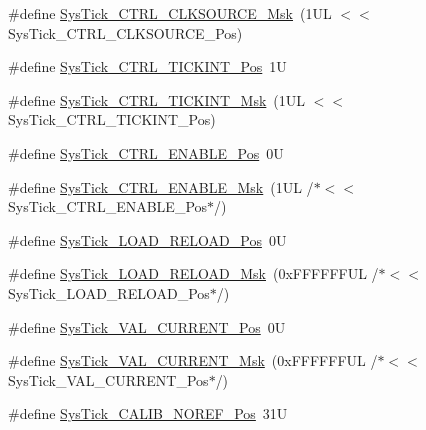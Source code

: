 \begin{DoxyCompactItemize}
\item 
\#define \mbox{\hyperlink{group___c_m_s_i_s___sys_tick_gaa41d06039797423a46596bd313d57373}{Sys\+Tick\+\_\+\+C\+T\+R\+L\+\_\+\+C\+L\+K\+S\+O\+U\+R\+C\+E\+\_\+\+Msk}}~(1\+U\+L $<$$<$ Sys\+Tick\+\_\+\+C\+T\+R\+L\+\_\+\+C\+L\+K\+S\+O\+U\+R\+C\+E\+\_\+\+Pos)
\item 
\#define \mbox{\hyperlink{group___c_m_s_i_s___sys_tick_ga88f45bbb89ce8df3cd2b2613c7b48214}{Sys\+Tick\+\_\+\+C\+T\+R\+L\+\_\+\+T\+I\+C\+K\+I\+N\+T\+\_\+\+Pos}}~1U
\item 
\#define \mbox{\hyperlink{group___c_m_s_i_s___sys_tick_ga95bb984266ca764024836a870238a027}{Sys\+Tick\+\_\+\+C\+T\+R\+L\+\_\+\+T\+I\+C\+K\+I\+N\+T\+\_\+\+Msk}}~(1\+U\+L $<$$<$ Sys\+Tick\+\_\+\+C\+T\+R\+L\+\_\+\+T\+I\+C\+K\+I\+N\+T\+\_\+\+Pos)
\item 
\#define \mbox{\hyperlink{group___c_m_s_i_s___sys_tick_ga0b48cc1e36d92a92e4bf632890314810}{Sys\+Tick\+\_\+\+C\+T\+R\+L\+\_\+\+E\+N\+A\+B\+L\+E\+\_\+\+Pos}}~0U
\item 
\#define \mbox{\hyperlink{group___c_m_s_i_s___sys_tick_ga16c9fee0ed0235524bdeb38af328fd1f}{Sys\+Tick\+\_\+\+C\+T\+R\+L\+\_\+\+E\+N\+A\+B\+L\+E\+\_\+\+Msk}}~(1\+U\+L /$\ast$$<$$<$ Sys\+Tick\+\_\+\+C\+T\+R\+L\+\_\+\+E\+N\+A\+B\+L\+E\+\_\+\+Pos$\ast$/)
\item 
\#define \mbox{\hyperlink{group___c_m_s_i_s___sys_tick_gaf44d10df359dc5bf5752b0894ae3bad2}{Sys\+Tick\+\_\+\+L\+O\+A\+D\+\_\+\+R\+E\+L\+O\+A\+D\+\_\+\+Pos}}~0U
\item 
\#define \mbox{\hyperlink{group___c_m_s_i_s___sys_tick_ga265912a7962f0e1abd170336e579b1b1}{Sys\+Tick\+\_\+\+L\+O\+A\+D\+\_\+\+R\+E\+L\+O\+A\+D\+\_\+\+Msk}}~(0x\+F\+F\+F\+F\+F\+F\+U\+L /$\ast$$<$$<$ Sys\+Tick\+\_\+\+L\+O\+A\+D\+\_\+\+R\+E\+L\+O\+A\+D\+\_\+\+Pos$\ast$/)
\item 
\#define \mbox{\hyperlink{group___c_m_s_i_s___sys_tick_ga3208104c3b019b5de35ae8c21d5c34dd}{Sys\+Tick\+\_\+\+V\+A\+L\+\_\+\+C\+U\+R\+R\+E\+N\+T\+\_\+\+Pos}}~0U
\item 
\#define \mbox{\hyperlink{group___c_m_s_i_s___sys_tick_gafc77b56d568930b49a2474debc75ab45}{Sys\+Tick\+\_\+\+V\+A\+L\+\_\+\+C\+U\+R\+R\+E\+N\+T\+\_\+\+Msk}}~(0x\+F\+F\+F\+F\+F\+F\+U\+L /$\ast$$<$$<$ Sys\+Tick\+\_\+\+V\+A\+L\+\_\+\+C\+U\+R\+R\+E\+N\+T\+\_\+\+Pos$\ast$/)
\item 
\#define \mbox{\hyperlink{group___c_m_s_i_s___sys_tick_ga534dbe414e7a46a6ce4c1eca1fbff409}{Sys\+Tick\+\_\+\+C\+A\+L\+I\+B\+\_\+\+N\+O\+R\+E\+F\+\_\+\+Pos}}~31U
\item 

\end{DoxyCompactItemize}
